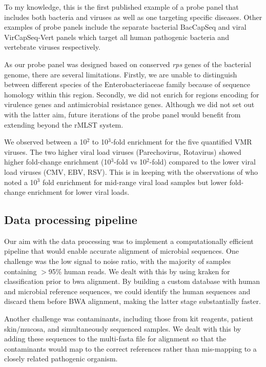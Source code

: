 To my knowledge, this is the first published example of a probe panel that includes both bacteria and viruses as well as one targeting specific diseases. Other examples of probe panels include the separate bacterial BacCapSeq \parencite{Allicock2018} and viral VirCapSeq-Vert \parencite{Briese2015} panels which target all human pathogenic bacteria and vertebrate viruses respectively. 

As our probe panel was designed based on conserved \textit{rps} genes of the bacterial genome, there are several limitations. Firstly, we are unable to distinguish between different species of the Enterobacteriaceae family because of sequence homology within this region. Secondly, we did not enrich for regions encoding for virulence genes and antimicrobial resistance genes. Although we did not set out with the latter aim, future iterations of the probe panel would benefit from extending beyond the rMLST system.

We observed between a 10$^2$ to 10$^3$-fold enrichment for the five quantified VMR viruses. The two higher viral load viruses (Parechovirus, Rotavirus) showed higher fold-change enrichment (10$^3$-fold vs 10$^2$-fold) compared to the lower viral load viruses (CMV, EBV, RSV). This is in keeping with the observations of \parencite{Bonsall2015} who noted a 10$^3$ fold enrichment for mid-range viral load samples but lower fold-change enrichment for lower viral loads. 

\subsection{Data processing pipeline}
Our aim with the data processing was to implement a computationally efficient pipeline that would enable accurate alignment of microbial sequences. One challenge was the low signal to noise ratio, with the majority of samples containing $>$95\% human reads. We dealt with this by using kraken for classification prior to bwa alignment. By building a custom database with human and microbial reference sequences, we could identify the human sequences and discard them before BWA alignment, making the latter stage substantially faster.

Another challenge was contaminants, including those from kit reagents, patient skin/mucosa, and simultaneously sequenced samples. We dealt with this by adding these sequences to the multi-fasta file for alignment so that the contaminants would map to the correct references rather than mis-mapping to a closely related pathogenic organism. 

